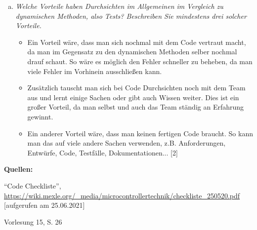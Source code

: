 \begin{enumerate}[a)]
\begin{itemize}
    \end{itemize}
    \item {\itshape Welche Vorteile haben Durchsichten im Allgemeinen im Vergleich zu dynamischen Methoden, also Tests? Beschreiben Sie mindestens drei solcher Vorteile.}
    \begin{itemize}
        \item Ein Vorteil wäre, dass man sich nochmal mit dem Code vertraut macht, da man im Gegensatz zu den dynamischen Methoden selber nochmal drauf schaut. So wäre es möglich den Fehler schneller zu beheben, da man viele Fehler im Vorhinein ausschließen kann.
        \item Zusätzlich tauscht man sich bei Code Durchsichten noch mit dem Team aus und lernt einige Sachen oder gibt auch Wissen weiter. Dies ist ein großer Vorteil, da man selbst und auch das Team ständig an Erfahrung gewinnt.
        \item Ein anderer Vorteil wäre, dass man keinen fertigen Code braucht. So kann man das auf viele andere Sachen verwenden, z.B. Anforderungen, Entwürfe, Code, Testfälle, Dokumentationen... [2]
    \end{itemize}

\end{enumerate}
\textbf{Quellen:}
\begin{enumerate}[{[1]}]
    \item  ``Code Checkliste'', \url{https://wiki.mexle.org/_media/microcontrollertechnik/checkliste_250520.pdf} [aufgerufen am 25.06.2021]
    \item Vorlesung 15, S. 26
\end{enumerate}


